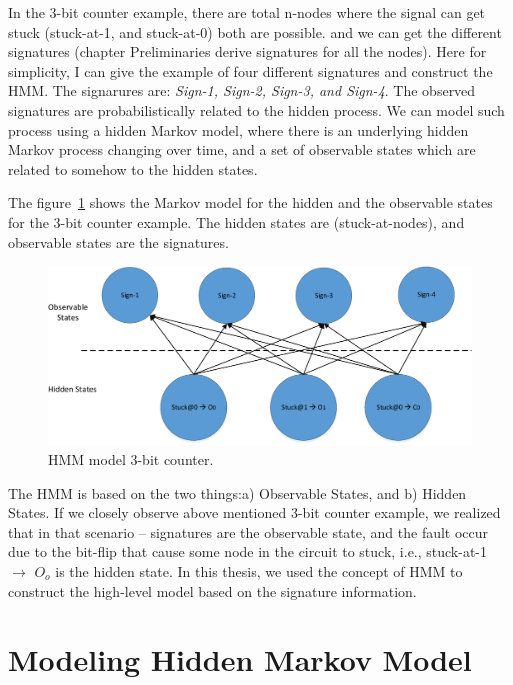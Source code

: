 In the 3-bit counter example, there are total n-nodes where the signal can get stuck (stuck-at-1, and stuck-at-0) both are possible. and we can get the  different signatures (chapter Preliminaries derive signatures for all the nodes). Here for simplicity, I can give the example of four different signatures and construct the HMM. The signarures are: \textit{Sign-1, Sign-2, Sign-3, and Sign-4}. The observed signatures are probabilistically related to the hidden process. We can model such process using a hidden Markov model, where there is an underlying hidden Markov process changing over time, and a set of observable states which are related to somehow to the hidden states.


The figure~\ref{fig:HMM-3-bit} shows the Markov model for the hidden and the observable states for the 3-bit counter example. The hidden states are (stuck-at-nodes), and observable states are  the signatures. 


\begin{figure}[tb!]

 \centering
  \captionsetup{justification=centering}    
   \includegraphics[scale=0.8]{Figures/HMM.pdf}
   \caption{HMM model 3-bit counter.}
\label{fig:HMM-3-bit}
\end{figure}




The HMM is based on  the two things:a) Observable States, and b) Hidden States. If we closely observe above mentioned 3-bit counter example, we realized that in that scenario --  signatures are the observable state, and the fault occur due to the bit-flip that cause some node in the circuit to stuck, i.e., stuck-at-1 $\rightarrow$ $O_o$ is the hidden state. In this thesis, we used the concept of HMM to construct the high-level model based on the signature information.





\section{Modeling Hidden Markov Model}


